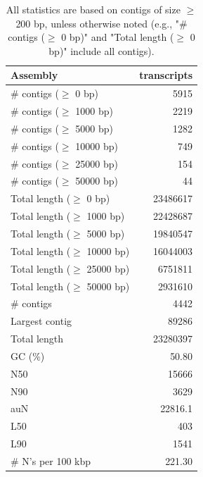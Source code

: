 \documentclass[12pt,a4paper]{article}
\begin{document}
\begin{table}[ht]
\begin{center}
\caption{All statistics are based on contigs of size $\geq$ 200 bp, unless otherwise noted (e.g., "\# contigs ($\geq$ 0 bp)" and "Total length ($\geq$ 0 bp)" include all contigs).}
\begin{tabular}{|l*{1}{|r}|}
\hline
Assembly & transcripts \\ \hline
\# contigs ($\geq$ 0 bp) & 5915 \\ \hline
\# contigs ($\geq$ 1000 bp) & 2219 \\ \hline
\# contigs ($\geq$ 5000 bp) & 1282 \\ \hline
\# contigs ($\geq$ 10000 bp) & 749 \\ \hline
\# contigs ($\geq$ 25000 bp) & 154 \\ \hline
\# contigs ($\geq$ 50000 bp) & 44 \\ \hline
Total length ($\geq$ 0 bp) & 23486617 \\ \hline
Total length ($\geq$ 1000 bp) & 22428687 \\ \hline
Total length ($\geq$ 5000 bp) & 19840547 \\ \hline
Total length ($\geq$ 10000 bp) & 16044003 \\ \hline
Total length ($\geq$ 25000 bp) & 6751811 \\ \hline
Total length ($\geq$ 50000 bp) & 2931610 \\ \hline
\# contigs & 4442 \\ \hline
Largest contig & 89286 \\ \hline
Total length & 23280397 \\ \hline
GC (\%) & 50.80 \\ \hline
N50 & 15666 \\ \hline
N90 & 3629 \\ \hline
auN & 22816.1 \\ \hline
L50 & 403 \\ \hline
L90 & 1541 \\ \hline
\# N's per 100 kbp & 221.30 \\ \hline
\end{tabular}
\end{center}
\end{table}
\end{document}
